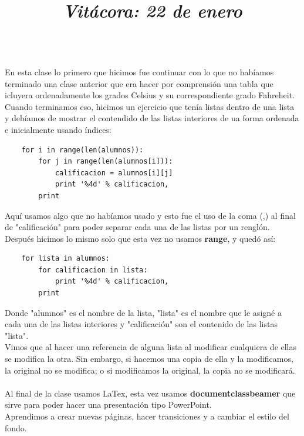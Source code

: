 \documentclass{article}
\begin{document}
	\title{\Huge\textbf{\color{purple}\textit{Vitácora: 22 de enero\\}}} \\
	En esta clase lo primero que hicimos fue continuar con lo que no habíamos terminado una clase anterior que era hacer por comprensión una tabla que icluyera ordenadamente los grados Celsius y su correspondiente grado Fahreheit. \\
	Cuando terminamos eso, hicimos un ejercicio que tenía listas dentro de una lista y debíamos de mostrar el contendido de las listas interiores de ua forma ordenada e inicialmente usando índices:\\
	\begin{verbatim}
	for i in range(len(alumnos)):
		for j in range(len(alumnos[i])):
			calificacion = alumnos[i][j]
			print '%4d' % calificacion,
		print 
	\end{verbatim}
	Aquí usamos algo que no habíamos usado y esto fue el uso de la coma (,) al final de "calificación" para poder separar cada una de las listas por un renglón. \\
	Después hicimos lo mismo solo que esta vez no usamos \textbf{range}, y quedó así: \\
	\begin{verbatim}
	for lista in alumnos:
		for calificacion in lista:
			print '%4d' % calificacion,
		print
	\end{verbatim} 
Donde "alumnos" es el nombre de la lista, "lista" es el nombre que le asigné a cada una de las listas interiores y "calificación" son el contenido de las listas "lista". \\ 
	Vimos que al hacer una referencia de alguna lista al modificar cualquiera de ellas se modifica la otra. Sin embargo, si hacemos una copia de ella y la modificamos, la original no se modifica; o si modificamos la original, la copia no se modificará. \\ \\
	Al final de la clase usamos LaTex, esta vez usamos \textbf{documentclass{beamer}} que sirve para poder hacer una presentación tipo PowerPoint. \\
	Aprendimos a crear nuevas páginas, hacer transiciones y a cambiar el estilo del fondo.
\end{document}
